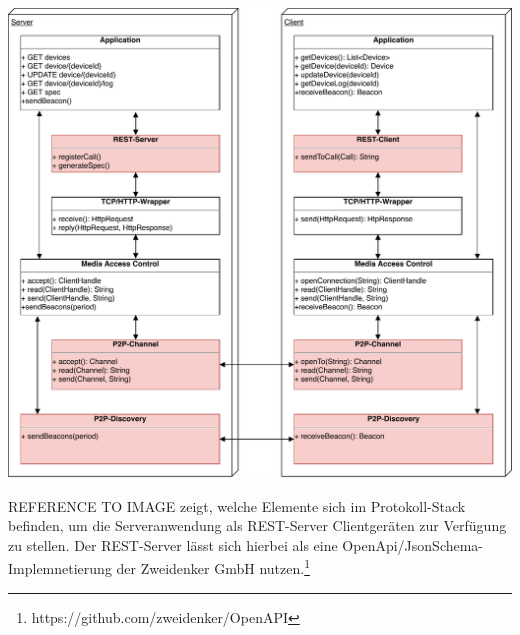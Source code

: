     \includegraphics{IOT-Connectivity-Protocol-Stack}

    REFERENCE TO IMAGE zeigt, welche Elemente sich im Protokoll-Stack befinden, um die Serveranwendung als REST-Server Clientgeräten zur Verfügung zu stellen.
    Der REST-Server lässt sich hierbei als eine OpenApi/JsonSchema-Implemnetierung der Zweidenker GmbH nutzen.\footnote{https://github.com/zweidenker/OpenAPI}
